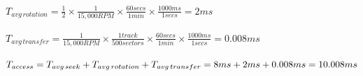 \documentclass{article}
\begin{document}
$T_{avg\,rotation} = \frac{1}{2} \times \frac{1}{15,000RPM} 
\times \frac{60secs}{1min} \times \frac{1000ms}{1secs} = 2ms $ \\
\\
$T_{avg\,transfer} = \frac{1}{15,000RPM} \times \frac{1track}{500sectors} \times
\frac{60secs}{1min} \times \frac{1000ms}{1secs} = 0.008ms $ \\
\\
$T_{access} = T_{avg\,seek} + T_{avg\,rotation} + T_{avg\,transfer} \\
= 8ms + 2ms + 0.008ms = 10.008ms $
\end{document}

